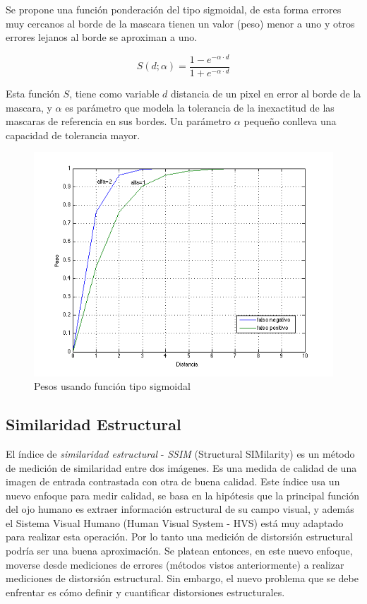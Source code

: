 Se propone una función ponderación del tipo sigmoidal, de esta forma errores muy cercanos al borde de la mascara tienen un valor (peso) menor a uno y otros errores lejanos al borde se aproximan a uno. 

\begin{equation}
S(d;\alpha) = \frac{1 - e^{-\alpha \cdot d}}{1 + e^{-\alpha \cdot d}}
\end{equation}

Esta función $S$, tiene como variable $d$ distancia de un pixel en error al borde de la mascara, y $\alpha$ es parámetro que modela la tolerancia de la inexactitud de las mascaras de referencia en sus bordes. Un parámetro $\alpha$ pequeño conlleva una capacidad de tolerancia mayor. 

\begin{figure}[!ht]
\centering
\includegraphics[scale=0.4]{img/sigmoid_function}
\caption{Pesos usando función tipo sigmoidal}
\label{fig:Pesos tipo sigmoidal}
\end{figure}


\subsection{Similaridad Estructural}
El índice de \emph{similaridad estructural} - \emph{SSIM} (Structural SIMilarity) \cite{park_benchmark_2013} \cite{wang_image_2004} es un método de medición de similaridad entre dos imágenes. Es una medida de calidad de una imagen de entrada contrastada con otra de buena calidad. Este índice usa un nuevo enfoque para medir calidad, se basa en la hipótesis que la principal función del ojo humano  es extraer información estructural de su campo visual, y además el Sistema Visual Humano (Human Visual System - HVS) está muy adaptado para realizar esta operación. Por lo tanto una medición de distorsión estructural podría ser una buena aproximación. Se platean entonces, en este nuevo enfoque, moverse desde mediciones de errores (métodos vistos anteriormente) a realizar mediciones de distorsión estructural. Sin embargo, el nuevo problema que se debe enfrentar es cómo definir y cuantificar distorsiones estructurales.

